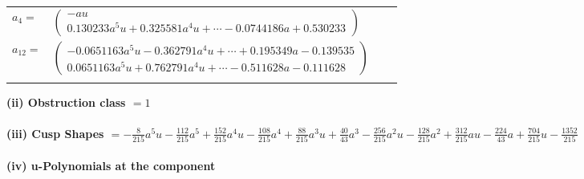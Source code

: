 \documentclass[1p]{elsarticle_modified}
\theoremstyle{definition}
\begin{document}
\begin{tabular}{m{7pt} m{180pt} m{7pt} m{180pt} }
\flushright $a_{4}=$&$\begin{pmatrix}- a u\\0.130233 a^{5} u+0.325581 a^{4} u+\cdots-0.0744186 a+0.530233\end{pmatrix}$ \\
\flushright $a_{12}=$&$\begin{pmatrix}-0.0651163 a^{5} u-0.362791 a^{4} u+\cdots+0.195349 a-0.139535\\0.0651163 a^{5} u+0.762791 a^{4} u+\cdots-0.511628 a-0.111628\end{pmatrix}$\\&\end{tabular}
\flushleft \textbf{(ii) Obstruction class $= 1$}\\~\\
\flushleft \textbf{(iii) Cusp Shapes $= -\frac{8}{215} a^5 u-\frac{112}{215} a^5+\frac{152}{215} a^4 u-\frac{108}{215} a^4+\frac{88}{215} a^3 u+\frac{40}{43} a^3-\frac{256}{215} a^2 u-\frac{128}{215} a^2+\frac{312}{215} a u-\frac{224}{43} a+\frac{704}{215} u-\frac{1352}{215}$}\\~\\
\newpage\renewcommand{\arraystretch}{1}
\flushleft \textbf{(iv) u-Polynomials at the component}\newline \\
\end{document}

